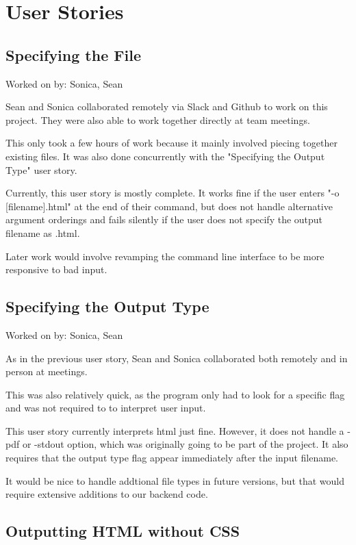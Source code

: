 \section{User Stories}

\subsection{Specifying the File}

Worked on by: Sonica, Sean

Sean and Sonica collaborated remotely via Slack and Github to work on this project. They were also able to work together directly at team meetings.

This only took a few hours of work because it mainly involved piecing together existing files. It was also done concurrently with the "Specifying the Output Type" user story.

Currently, this user story is mostly complete. It works fine if the user enters "-o [filename].html" at the end of their command, but does not handle alternative argument orderings and fails silently if the user does not specify the output filename as .html.

Later work would involve revamping the command line interface to be more responsive to bad input.

\subsection{Specifying the Output Type}

Worked on by: Sonica, Sean

As in the previous user story, Sean and Sonica collaborated both remotely and in person at meetings.

This was also relatively quick, as the program only had to look for a specific flag and was not required to to interpret user input.

This user story currently interprets html just fine. However, it does not handle a -pdf or -stdout option, which was originally going to be part of the project. It also requires that the output type flag appear immediately after the input filename.

It would be nice to handle addtional file types in future versions, but that would require extensive additions to our backend code.

\subsection{Outputting HTML without CSS}

